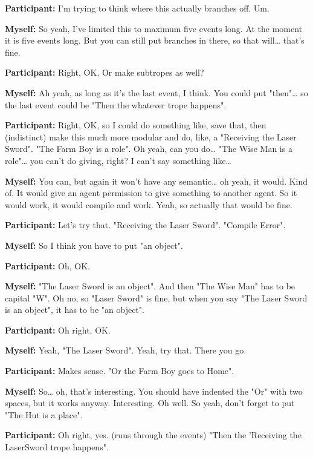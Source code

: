\documentclass[11pt]{report}
\begin{document}
\begin{linenumbers}
\textbf{Participant:} I'm trying to think where this actually branches off. Um.

\textbf{Myself:} So yeah, I've limited this to maximum five events long. At the
moment it is five events long. But you can still put branches in there, so that
will\ldots{} that's fine.

\textbf{Participant:} Right, OK. Or make subtropes as well?

\textbf{Myself:} Ah yeah, as long as it's the last event, I think. You could put "then"\ldots{} so the last event could be "Then the whatever trope happens".

\textbf{Participant:} Right, OK, so I could do something like, save that, then
(indistinct) make this much more modular and do, like, a "Receiving the Laser
Sword". "The Farm Boy is a role". Oh yeah, can you do\ldots{} "The Wise Man is a
role"\ldots{} you can't do giving, right? I can't say something
like\ldots{}

\textbf{Myself:} You can, but again it won't have any semantic\ldots{} oh yeah, it would. Kind of. It would give an agent permission to give something to another agent. So it would work, it would compile and work. Yeah, so actually that would be fine.

\textbf{Participant:} Let's try that. "Receiving the Laser Sword". "Compile Error".

\textbf{Myself:} So I think you have to put "an object".

\textbf{Participant:} Oh, OK.

\textbf{Myself:} "The Laser Sword is an object". And then "The Wise Man" has to be capital "W". Oh no, so "Laser Sword" is fine, but when you say "The Laser Sword is an object", it has to be "an object".

\textbf{Participant:} Oh right, OK. 

\textbf{Myself:} Yeah, "The Laser Sword". Yeah, try that. There you go.

\textbf{Participant:} Makes sense. "Or the Farm Boy goes to Home".

\textbf{Myself:} So\ldots{} oh, that's interesting. You should have indented the "Or" with two spaces, but it works anyway. Interesting. Oh well. So yeah, don't forget to put "The Hut is a place".

\textbf{Participant:} Oh right, yes. (runs through the events) "Then the 'Receiving the LaserSword trope happens".


\end{linenumbers}
\end{document}
